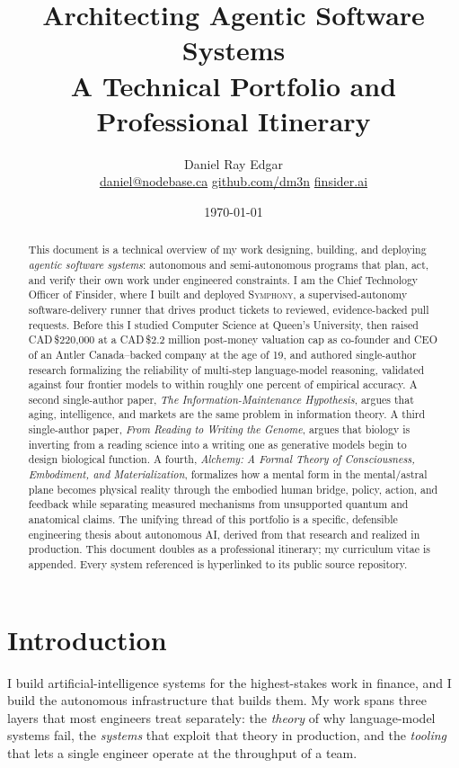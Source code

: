 \documentclass[11pt]{article}
\title{\textbf{Architecting Agentic Software Systems}\\[2pt]
\large A Technical Portfolio and Professional Itinerary}
\author{Daniel Ray Edgar\\[2pt]
\normalsize \href{mailto:daniel@nodebase.ca}{daniel@nodebase.ca} \quad\textbar\quad
\href{https://github.com/dm3n}{github.com/dm3n} \quad\textbar\quad
\href{https://finsider.ai}{finsider.ai}}
\date{\today}
\theoremstyle{plain}
\theoremstyle{definition}
\begin{document}
\maketitle

\begin{abstract}
\noindent
This document is a technical overview of my work designing, building, and deploying
\emph{agentic software systems}: autonomous and semi-autonomous programs that plan,
act, and verify their own work under engineered constraints. I am the Chief Technology
Officer of Finsider, where I built and deployed \textsc{Symphony}, a supervised-autonomy
software-delivery runner that drives product tickets to reviewed, evidence-backed pull
requests. Before this I studied Computer Science at Queen's University, then raised
CAD\,\$220{,}000 at a CAD\,\$2.2 million post-money valuation cap as co-founder and CEO of an Antler Canada--backed company
at the age of 19, and authored single-author research formalizing the reliability of
multi-step language-model reasoning, validated against four frontier models to within
roughly one percent of empirical accuracy. A second single-author paper, \emph{The
Information-Maintenance Hypothesis}, argues that aging, intelligence, and markets are the
same problem in information theory. A third single-author paper, \emph{From Reading to
Writing the Genome}, argues that biology is inverting from a reading science into a writing
one as generative models begin to design biological function. A fourth,
\emph{Alchemy: A Formal Theory of Consciousness, Embodiment, and Materialization},
formalizes how a mental form in the mental/astral plane becomes physical reality
through the embodied human bridge, policy, action, and feedback while separating measured mechanisms from
unsupported quantum and anatomical claims. The unifying thread of this portfolio is a specific, defensible
engineering thesis about autonomous AI, derived from that research and realized in
production. This document doubles as a professional itinerary; my curriculum vitae is
appended. Every system referenced is hyperlinked to its public source repository.
\end{abstract}

\section{Introduction}
I build artificial-intelligence systems for the highest-stakes work in finance, and I build
the autonomous infrastructure that builds them. My work spans three layers that most
engineers treat separately: the \emph{theory} of why language-model systems fail, the
\emph{systems} that exploit that theory in production, and the \emph{tooling} that lets a
single engineer operate at the throughput of a team.
\end{document}
